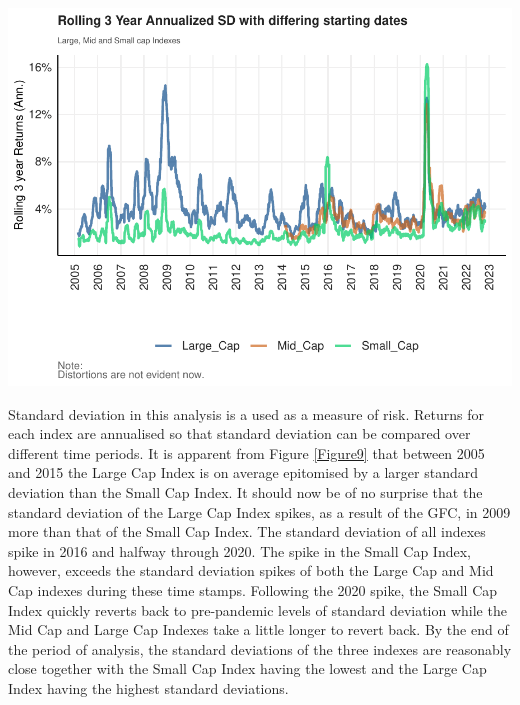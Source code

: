 \documentclass[11pt,preprint, authoryear]{elsarticle}
\let\origfigure\figure
\let\endorigfigure\endfigure
\renewenvironment{figure}[1][2] {
    \expandafter\origfigure\expandafter[H]
} {
    \endorigfigure
}
\numberwithin{equation}{section}
\numberwithin{figure}{section}
\numberwithin{table}{section}
\begin{document}
\begin{figure}[H]

{\centering \includegraphics{Volatility-of-Shares_files/figure-latex/Figure9-1} 

}

\caption{Rolling Annualised Standard Deviation of the Indexes \label{Figure9}}\label{fig:Figure9}
\end{figure}

Standard deviation in this analysis is a used as a measure of risk.
Returns for each index are annualised so that standard deviation can be
compared over different time periods. It is apparent from Figure
\ref{Figure9} that between 2005 and 2015 the Large Cap Index is on
average epitomised by a larger standard deviation than the Small Cap
Index. It should now be of no surprise that the standard deviation of
the Large Cap Index spikes, as a result of the GFC, in 2009 more than
that of the Small Cap Index. The standard deviation of all indexes spike
in 2016 and halfway through 2020. The spike in the Small Cap Index,
however, exceeds the standard deviation spikes of both the Large Cap and
Mid Cap indexes during these time stamps. Following the 2020 spike, the
Small Cap Index quickly reverts back to pre-pandemic levels of standard
deviation while the Mid Cap and Large Cap Indexes take a little longer
to revert back. By the end of the period of analysis, the standard
deviations of the three indexes are reasonably close together with the
Small Cap Index having the lowest and the Large Cap Index having the
highest standard deviations.
\end{document}
